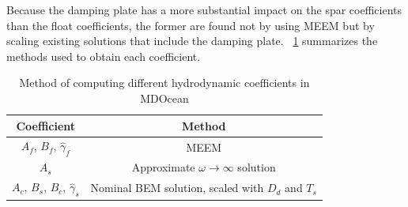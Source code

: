Because the damping plate has a more substantial impact on the spar coefficients than the float coefficients, the former are found not by using MEEM but by scaling existing solutions that include the damping plate.
\tableautorefname~\ref{tab:hydro-methods} summarizes the methods used to obtain each coefficient.

\begin{table}
    \centering
    \begin{tabular}{cc}
         Coefficient& Method\\ \hline
         $A_f$, $B_f$, $\hat{\gamma}_f$& MEEM\\
         $A_s$& Approximate $\omega\rightarrow\infty$ solution\\
         $A_c$, $B_s$, $B_c$, $\hat{\gamma}_s$& Nominal BEM solution, scaled with $D_d$ and $T_s$\\
    \end{tabular}
    \caption{Method of computing different hydrodynamic coefficients in MDOcean}
    \label{tab:hydro-methods}
\end{table}


